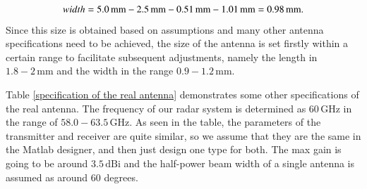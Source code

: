 \documentclass[12pt,DIV14,BCOR12mm,a4paper,footinclude=false,headinclude,parskip=half-,twoside,openright,cleardoublepage=empty,toc=index,bibliography=totoc,listof=totoc]{scrreprt}
\numberwithin{equation}{chapter}
\begin{document}
\begin{equation}
    \centering
    width = 5.0\,\mathrm{mm} - 2.5\,\mathrm{mm} - 0.51\,\mathrm{mm} - 1.01\,\mathrm{mm} = 0.98\,\mathrm{mm}.
\end{equation}
Since this size is obtained based on assumptions and many other antenna specifications need to be achieved, the size of the antenna is set firstly within a certain range to facilitate subsequent adjustments, namely the length in $1.8-2\,\mathrm{mm}$ and the width in the range $0.9-1.2\,\mathrm{mm}$.

Table \ref{specification of the real antenna} \cite{datasheet} demonstrates some other specifications of the real antenna. The frequency of our radar system is determined as $60\,\mathrm{GHz}$ in the range of $58.0-63.5\,\mathrm{GHz}$. As seen in the table, the parameters of the transmitter and receiver are quite similar, so we assume that they are the same in the Matlab designer, and then just design one type for both. The max gain is going to be around $3.5\,\mathrm{dBi}$ and the half-power beam width of a single antenna is assumed as around 60 degrees.
\end{document}

